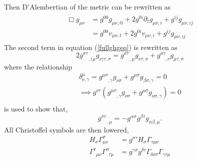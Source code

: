 \documentclass[11pt]{article}
\newcommand{\blank}{\enspace}
\newcommand{\blankt}{\text{ }}
\numberwithin{equation}{section}
\begin{document}
Then D'Alembertian of the metric can be rewritten as
\begin{align}
\begin{split}
    \Box g_{\mu\nu} &= g^{00}g_{\mu\nu,tt} + 2g^{0i}\partial_tg_{\mu\nu,i} + g^{ij}g_{\mu\nu,ij} \\ 
                    &= g^{00}v_{\mu\nu,t} + 2g^{0i}v_{\mu\nu,i} + g^{ij}g_{\mu\nu,ij} 
\end{split}
\end{align}
The second term in equation (\ref{fullghgeq}) is rewritten as
\begin{equation}
    2g^{\sigma\tau}_{\blank\blankt,(\mu}g_{\nu)\tau,\sigma} = g^{\sigma\tau}_{\blank\blankt,\mu}g_{\nu\tau,\sigma} + g^{\sigma\tau}_{\blank\blank,\nu}g_{\mu\tau,\sigma} 
\end{equation}
where the relationship 
\begin{equation}
\begin{split}
    \delta^{\mu}_{\nu,\gamma} = g^{\mu\sigma}_{\blank\blankt,\gamma}g_{\nu\sigma} + g^{\mu\sigma}g_{\beta\sigma,\gamma} = 0 \\
    \implies g^{\nu\tau}(g^{\mu\sigma}_{\blank\blankt,\gamma}g_{\nu\sigma} + g^{\mu\sigma}g_{\nu\sigma,\gamma}) = 0 \\
    \end{split}
\end{equation}
is used to show that,
\begin{equation}
    g^{\sigma\tau}_{\blank\blankt,\mu} = -g^{\alpha\sigma}g^{\beta\tau}g_{\alpha\beta,\mu}.
\end{equation}
All Christoffel symbols are then lowered, 
\begin{align}
    H_{\sigma}\Gamma^{\sigma}_{\mu\nu} &= g^{\sigma\tau}H_{\sigma}\Gamma_{\tau\mu\nu} \\
    \Gamma^{\tau}_{\blank\mu\nu}\Gamma^{\sigma}_{\blank\tau\mu} &= g^{\gamma\sigma}g^{\delta\tau}\Gamma_{\delta\nu\sigma}\Gamma_{\gamma\tau\mu}
\end{align}
\end{document}
